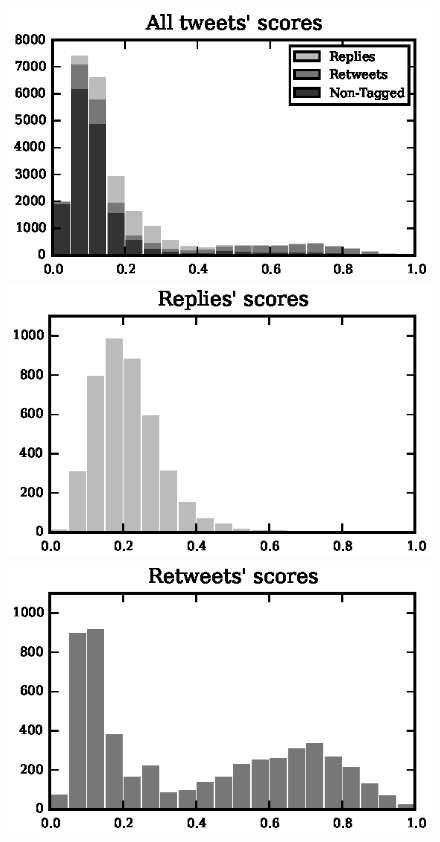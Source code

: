 \begin{figure}[!htbp]
\centering
\includegraphics[scale=1]{./figures/all_tfidf_histogram.eps}
\includegraphics{./figures/replies_tfidf_histogram.eps}
\includegraphics{./figures/retweets_tfidf_histogram.eps}

\end{figure}

